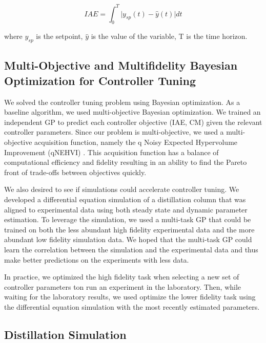 \begin{equation}
    IAE = \int_0^T \vert y_{sp}(t) - \hat y(t) \vert dt
\end{equation}

where $y_{sp}$ is the setpoint,  $\hat y$  is the value of  the variable, T is the time horizon. 

\subsection{Multi-Objective and Multifidelity Bayesian Optimization for Controller Tuning}

We solved the controller tuning problem using Bayesian optimization. As a baseline algorithm, we used multi-objective Bayesian optimization. We trained an independent GP to predict each controller objective (IAE, CM) given the relevant controller parameters.  Since our problem is multi-objective, we used a multi-objective acquisition function, namely the q Noisy Expected Hypervolume Improvement (qNEHVI) \cite{Balandat2020}. This acquisition function has a balance of computational efficiency and fidelity resulting in an ability to find the Pareto front of trade-offs between objectives quickly. 

We also desired to see if simulations could accelerate controller tuning. We developed a differential equation simulation of a distillation column that was aligned to experimental data using both steady state and dynamic parameter estimation. To leverage the simulation, we used a multi-task GP that could be trained on both the less abundant high fidelity experimental data and the more abundant low fidelity simulation data. We hoped that the multi-task GP could learn the correlation between the simulation and the experimental data and thus make better predictions on the experiments with less data.

In practice, we optimized the high fidelity task when selecting  a new set of controller parameters ton run an experiment in the laboratory. Then, while waiting for the laboratory results, we used optimize the lower fidelity task using the differential equation simulation with the most recently estimated parameters. 


\subsection{Distillation Simulation}\label{sec:distillation_model}

